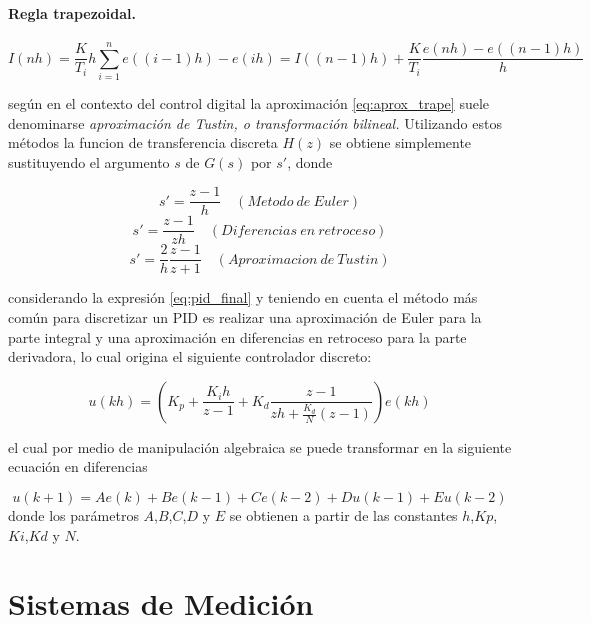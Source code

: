 \documentclass[10pt,conference,a4paper,onecolumn]{article}%
\begin{document}
  \paragraph{Regla trapezoidal.} 
  
  \begin{equation}
  I(nh)=\frac{K}{T_i}h \sum_{i=1}^{n}e((i-1)h)-e(ih)=I((n-1)h)+  \frac{K}{T_i} \frac{e(nh) -e((n-1)h)}{h}
  \label{eq:aprox_trape} 
  \end{equation}
  
  según \cite{astrom} en el contexto del control digital la aproximación \ref{eq:aprox_trape} suele denominarse \textit{aproximación de Tustin, o transformación bilineal.} Utilizando estos métodos la funcion de transferencia discreta $H(z)$ se obtiene simplemente sustituyendo el argumento $s$ de $G(s)$ por $s'$, donde
  
  \begin{equation}
  s'=\frac{z-1}{h} \quad (Metodo\ de\ Euler)
\end{equation}   
  \begin{equation}
  s'=\frac{z-1}{zh} \quad (Diferencias\ en\ retroceso)
\end{equation}   
\begin{equation}
  s'=\frac{2}{h} \frac{z-1}{z+1} \quad (Aproximacion\ de\ Tustin)
\end{equation}  

considerando la expresión \ref{eq:pid_final} y teniendo en cuenta \cite[pág. 219]{astrom} el método más común para discretizar un PID es realizar una aproximación de Euler para la parte integral y una aproximación en diferencias en retroceso para la parte derivadora, lo cual origina el siguiente controlador discreto:

\begin{equation}
  u(kh)=\left(K_p + \frac{K_ih}{z-1} + K_d\frac{z-1}{zh+\frac{K_d}{N}(z-1)}	  \right) e(kh)
\end{equation}  

el cual por medio de manipulación algebraica se puede transformar en la siguiente ecuación en diferencias

\begin{equation}
u(k+1)=Ae(k)+Be(k-1)+Ce(k-2)+Du(k-1)+Eu(k-2)
\end{equation} 
donde los parámetros $A$,$B$,$C$,$D$ y $E$ se obtienen a partir de las constantes $h$,$Kp$,$Ki$,$Kd$ y $N$.
\section{Sistemas de Medición}
\label{sec:sist_de_medicion}
\end{document}
